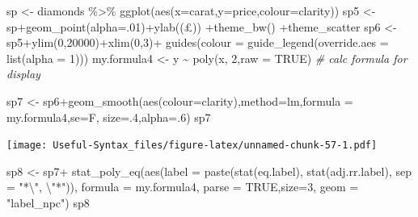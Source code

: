 \documentclass[
]{article}
\newenvironment{Shaded}{\begin{snugshade}}{\end{snugshade}}
\newcommand{\AttributeTok}[1]{\textcolor[rgb]{0.77,0.63,0.00}{#1}}
\newcommand{\CommentTok}[1]{\textcolor[rgb]{0.56,0.35,0.01}{\textit{#1}}}
\newcommand{\ConstantTok}[1]{\textcolor[rgb]{0.00,0.00,0.00}{#1}}
\newcommand{\DecValTok}[1]{\textcolor[rgb]{0.00,0.00,0.81}{#1}}
\newcommand{\FunctionTok}[1]{\textcolor[rgb]{0.00,0.00,0.00}{#1}}
\newcommand{\NormalTok}[1]{#1}
\newcommand{\OtherTok}[1]{\textcolor[rgb]{0.56,0.35,0.01}{#1}}
\newcommand{\SpecialCharTok}[1]{\textcolor[rgb]{0.00,0.00,0.00}{#1}}
\newcommand{\StringTok}[1]{\textcolor[rgb]{0.31,0.60,0.02}{#1}}
\begin{document}
\begin{Shaded}
\begin{Highlighting}[]
\NormalTok{sp }\OtherTok{\textless{}{-}}\NormalTok{ diamonds }\SpecialCharTok{\%\textgreater{}\%} \FunctionTok{ggplot}\NormalTok{(}\FunctionTok{aes}\NormalTok{(}\AttributeTok{x=}\NormalTok{carat,}\AttributeTok{y=}\NormalTok{price,}\AttributeTok{colour=}\NormalTok{clarity))}
\NormalTok{sp5 }\OtherTok{\textless{}{-}}\NormalTok{ sp}\SpecialCharTok{+}\FunctionTok{geom\_point}\NormalTok{(}\AttributeTok{alpha=}\NormalTok{.}\DecValTok{01}\NormalTok{)}\SpecialCharTok{+}\FunctionTok{ylab}\NormalTok{(}\StringTok{\textquotesingle{}(£)\textquotesingle{}}\NormalTok{) }\SpecialCharTok{+}\FunctionTok{theme\_bw}\NormalTok{() }\SpecialCharTok{+}\NormalTok{theme\_scatter}
\NormalTok{sp6 }\OtherTok{\textless{}{-}}\NormalTok{ sp5}\SpecialCharTok{+}\FunctionTok{ylim}\NormalTok{(}\DecValTok{0}\NormalTok{,}\DecValTok{20000}\NormalTok{)}\SpecialCharTok{+}\FunctionTok{xlim}\NormalTok{(}\DecValTok{0}\NormalTok{,}\DecValTok{3}\NormalTok{)}\SpecialCharTok{+} \FunctionTok{guides}\NormalTok{(}\AttributeTok{colour =} \FunctionTok{guide\_legend}\NormalTok{(}\AttributeTok{override.aes =} \FunctionTok{list}\NormalTok{(}\AttributeTok{alpha =} \DecValTok{1}\NormalTok{)))}
\NormalTok{my.formula4 }\OtherTok{\textless{}{-}}\NormalTok{ y }\SpecialCharTok{\textasciitilde{}} \FunctionTok{poly}\NormalTok{(x, }\DecValTok{2}\NormalTok{,}\AttributeTok{raw =} \ConstantTok{TRUE}\NormalTok{) }\CommentTok{\# calc formula for display}

\NormalTok{sp7 }\OtherTok{\textless{}{-}}\NormalTok{ sp6}\SpecialCharTok{+}\FunctionTok{geom\_smooth}\NormalTok{(}\FunctionTok{aes}\NormalTok{(}\AttributeTok{colour=}\NormalTok{clarity),}\AttributeTok{method=}\StringTok{\textquotesingle{}lm\textquotesingle{}}\NormalTok{,}\AttributeTok{formula =}\NormalTok{ my.formula4,}\AttributeTok{se=}\NormalTok{F, }\AttributeTok{size=}\NormalTok{.}\DecValTok{4}\NormalTok{,}\AttributeTok{alpha=}\NormalTok{.}\DecValTok{6}\NormalTok{)}
\NormalTok{sp7}
\end{Highlighting}
\end{Shaded}

\texttt{[image: Useful-Syntax\_files/figure-latex/unnamed-chunk-57-1.pdf]}

\begin{Shaded}
\begin{Highlighting}[]
\NormalTok{sp8 }\OtherTok{\textless{}{-}}\NormalTok{ sp7}\SpecialCharTok{+}
  \FunctionTok{stat\_poly\_eq}\NormalTok{(}\FunctionTok{aes}\NormalTok{(}\AttributeTok{label =}  \FunctionTok{paste}\NormalTok{(}\FunctionTok{stat}\NormalTok{(eq.label),}
                                  \FunctionTok{stat}\NormalTok{(adj.rr.label), }\AttributeTok{sep =} \StringTok{"*}\SpecialCharTok{\textbackslash{}"}\StringTok{, }\SpecialCharTok{\textbackslash{}"}\StringTok{*"}\NormalTok{)),}
               \AttributeTok{formula =}\NormalTok{ my.formula4, }\AttributeTok{parse =} \ConstantTok{TRUE}\NormalTok{,}\AttributeTok{size=}\DecValTok{3}\NormalTok{,  }\AttributeTok{geom =} \StringTok{"label\_npc"}\NormalTok{)}
\NormalTok{sp8}
\end{Highlighting}
\end{Shaded}
\end{document}
